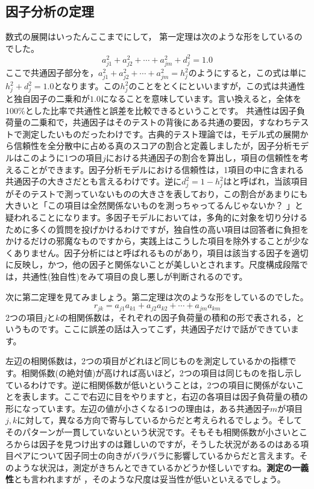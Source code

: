 \documentclass{ltjsbook}
\begin{document}
\subsection{因子分析の定理}
数式の展開はいったんここまでにして，
第一定理は次のような形をしているのでした。
\[a_{j1}^2+a_{j2}^2+ \cdots + a_{jm}^2 + d_j^2 = 1.0 \]
ここで共通因子部分を，$a_{j1}^2+a_{j2}^2+ \cdots + a_{jm}^2=h_j^2$のようにすると，この式は単に$h_j^2 + d_j^2 = 1.0$となります。この$h_j^2$のことをとくにといいますが，この式は共通性と独自因子の二乗和が$1.0$になることを意味しています。言い換えると，全体を100\%とした比率で共通性と誤差を比較できるということです。
共通性は因子負荷量の二乗和で，共通因子はそのテストの背後にある共通の要因，すなわちテストで測定したいものだったわけです。古典的テスト理論では，モデル式の展開から信頼性を全分散中に占める真のスコアの割合と定義しましたが，因子分析モデルはこのように1つの項目$j$における共通因子の割合を算出し，項目の信頼性を考えることができます。因子分析モデルにおける信頼性は，1項目の中に含まれる共通因子の大きさだとも言えるわけです。逆に$d_j^2=1-h_j^2$はと呼ばれ，当該項目がそのテストで測っていないものの大きさを表しており，この割合があまりにも大きいと「この項目は全然関係ないものを測っちゃってるんじゃないか？ 」と疑われることになります。多因子モデルにおいては，多角的に対象を切り分けるために多くの質問を投げかけるわけですが，独自性の高い項目は回答者に負担をかけるだけの邪魔なものですから，実践上はこうした項目を除外することが少なくありません。因子分析にはと呼ばれるものがあり，項目は該当する因子を適切に反映し，かつ，他の因子と関係ないことが美しいとされます。尺度構成段階では，共通性(独自性)をみて項目の良し悪しが判断されるのです。

次に第二定理を見てみましょう。第二定理は次のような形をしているのでした。
\[  r_{jk}=a_{j1}a_{k1}+a_{j2}a_{k2}+ \cdots +a_{jm}a_{km} \]
2つの項目$j$と$k$の相関係数は，それぞれの因子負荷量の積和の形で表される，というものです。ここに誤差の話は入ってこず，共通因子だけで話ができています。

左辺の相関係数は，2つの項目がどれほど同じものを測定しているかの指標です。相関係数(の絶対値)が高ければ高いほど，2つの項目は同じものを指し示しているわけです。逆に相関係数が低いということは，2つの項目に関係がないことを表します。ここで右辺に目をやりますと，右辺の各項目は因子負荷量の積の形になっています。左辺の値が小さくなる1つの理由は，ある共通因子$m$が項目$j,k$に対して，異なる方向で寄与しているからだと考えられるでしょう。そしてそのパターンが一貫していないという状況です。そもそも相関係数が小さいところからは因子を見つけ出すのは難しいのですが，そうした状況があるのはある項目ペアについて因子同士の向きがバラバラに影響しているからだと言えます。そのような状況は，測定がきちんとできているかどうか怪しいですね。\textbf{測定の一義性}とも言われますが
，そのような尺度は妥当性が低いといえるでしょう。
\end{document}
